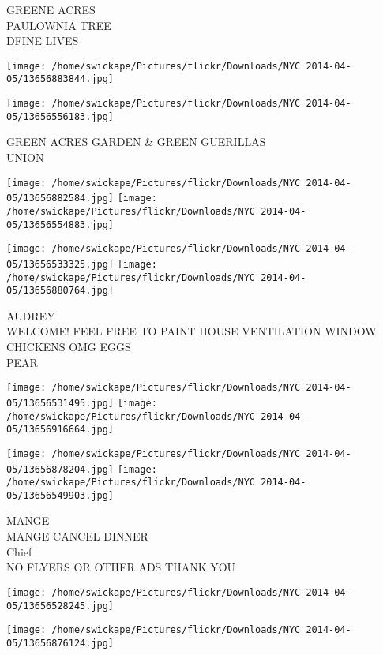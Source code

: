 \documentclass[10pt,letterpaper]{article}
\begin{document}
GREENE ACRES\\
PAULOWNIA TREE\\
DFINE LIVES\\
\pagebreak

\texttt{[image: /home/swickape/Pictures/flickr/Downloads/NYC 2014-04-05/13656883844.jpg]}

\vspace{0.25in}
\texttt{[image: /home/swickape/Pictures/flickr/Downloads/NYC 2014-04-05/13656556183.jpg]}

GREEN ACRES GARDEN \& GREEN GUERILLAS\\
UNION\\
\pagebreak

\texttt{[image: /home/swickape/Pictures/flickr/Downloads/NYC 2014-04-05/13656882584.jpg]}
\texttt{[image: /home/swickape/Pictures/flickr/Downloads/NYC 2014-04-05/13656554883.jpg]}

\texttt{[image: /home/swickape/Pictures/flickr/Downloads/NYC 2014-04-05/13656533325.jpg]}
\texttt{[image: /home/swickape/Pictures/flickr/Downloads/NYC 2014-04-05/13656880764.jpg]}

AUDREY\\
WELCOME!  FEEL FREE TO PAINT HOUSE  VENTILATION WINDOW\\
CHICKENS OMG EGGS\\
PEAR\\
\pagebreak

\texttt{[image: /home/swickape/Pictures/flickr/Downloads/NYC 2014-04-05/13656531495.jpg]}
\texttt{[image: /home/swickape/Pictures/flickr/Downloads/NYC 2014-04-05/13656916664.jpg]}

\texttt{[image: /home/swickape/Pictures/flickr/Downloads/NYC 2014-04-05/13656878204.jpg]}
\texttt{[image: /home/swickape/Pictures/flickr/Downloads/NYC 2014-04-05/13656549903.jpg]}

MANGE\\
MANGE CANCEL DINNER\\
Chief\\
NO FLYERS OR OTHER ADS THANK YOU\\
\pagebreak

\texttt{[image: /home/swickape/Pictures/flickr/Downloads/NYC 2014-04-05/13656528245.jpg]}

\vspace{0.25in}
\texttt{[image: /home/swickape/Pictures/flickr/Downloads/NYC 2014-04-05/13656876124.jpg]}
\end{document}
